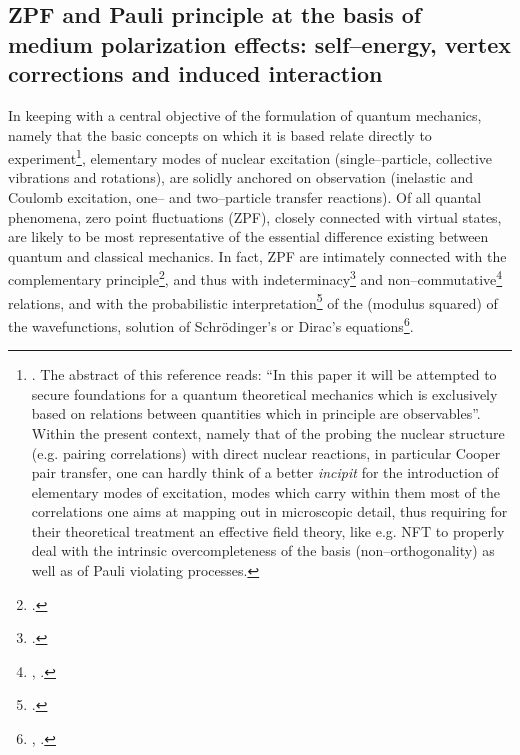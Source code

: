 \begin{subappendices}
\section[ZPF and Pauli principle]{ZPF and Pauli principle at the basis of medium polarization effects: self--energy, vertex corrections and induced interaction}\label{C7AppA}
In keeping with a central objective of the formulation of quantum mechanics, namely that the basic concepts on which it is based relate directly to experiment\footnote{\cite{Heisenberg:25}. The abstract of this reference reads: ``In this paper it will be attempted to secure foundations for a quantum theoretical mechanics which is exclusively based on relations between quantities which in principle are observables''. Within the present context, namely that of the probing the nuclear structure (e.g. pairing correlations) with direct nuclear reactions, in particular Cooper pair transfer, one can hardly think of a better \emph{incipit} for the introduction of elementary modes of excitation, modes which carry within them most of the correlations one aims at mapping out in microscopic detail, thus requiring for their theoretical treatment an effective field theory, like e.g. NFT to  properly deal with the intrinsic overcompleteness of the basis (non--orthogonality) as well as of Pauli violating processes.}, elementary modes of nuclear excitation (single--particle, collective vibrations and rotations), are solidly anchored on observation (inelastic and Coulomb excitation, one-- and two--particle transfer reactions). Of all quantal phenomena, zero point fluctuations (ZPF), closely connected with virtual states, are likely to be most representative of the essential difference existing between quantum and classical mechanics. In fact, ZPF are intimately connected with the complementary principle\footnote{\cite{Bohr:28}.}, and thus with  indeterminacy\footnote{\cite{Heisenberg:27}.} and non--commutative\footnote{\cite{Born:25a}, \cite{Born:25b}.} relations, and with the probabilistic interpretation\footnote{ \cite{Born:26}.} of the (modulus squared) of the wavefunctions, solution of Schr\"odinger's or Dirac's equations\footnote{\cite{Schrodinger:25}, \cite{Dirac:26}.}.
 \begin{figure}[h!]
 	\begin{center}

\end{center}
\end{figure}
\end{subappendices}
